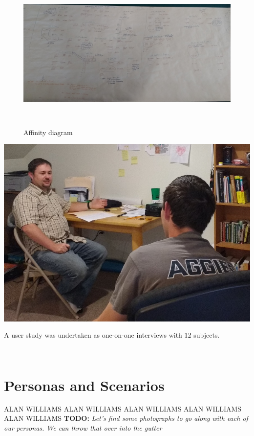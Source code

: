 \documentclass{sigchi-ext}
\begin{document}
\begin{figure}
  \includegraphics[width=0.9\columnwidth]{figures/affinity_diagram.jpg}
  \caption{Affinity diagram}~\label{fig:sample}
\end{figure}

\begin{marginfigure}[-15pc]
  \begin{minipage}{\marginparwidth}
    \centering
    \includegraphics[width=0.9\marginparwidth]{figures/user_study.jpg}
    \caption{A user study was undertaken as one-on-one interviews with 12 subjects.}~\label{fig:marginfig}
  \end{minipage}
\end{marginfigure}



\section{Personas and Scenarios}
ALAN WILLIAMS ALAN WILLIAMS ALAN WILLIAMS ALAN WILLIAMS ALAN WILLIAMS
\textbf{TODO:}
\textit{Let's find some photographs to go along with each of our personas.
We can throw that over into the gutter}
\end{document}
